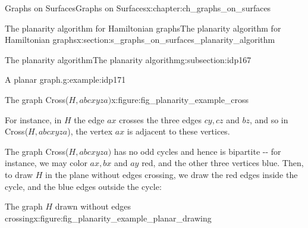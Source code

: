 \documentclass[oneside,10pt,]{book}
\numberwithin{equation}{section}
\begin{document}
\begin{chapterptx}{Graphs on Surfaces}{}{Graphs on Surfaces}{}{}{x:chapter:ch_graphs_on_surfaces}
\begin{sectionptx}{The planarity algorithm for Hamiltonian graphs}{}{The planarity algorithm for Hamiltonian graphs}{}{}{x:section:s_graphs_on_surfaces_planarity_algorithm}
\begin{subsectionptx}{The planarity algorithm}{}{The planarity algorithm}{}{}{g:subsection:idp167}
\begin{example}{A planar graph.}{g:example:idp171}
\begin{figureptx}{The graph Cross(\(H, abcxyza)\)}{x:figure:fig_planarity_example_cross}{}
\begin{image}{0.15}{0.7}{0.15}
{
}%
\end{image}%
\tcblower
\end{figureptx}%
For instance, in \(H\) the edge \(ax\) crosses the three edges \(cy, cz\) and \(bz\), and so in Cross(\(H, abcxyza\)), the vertex \(ax\) is adjacent to these vertices.%
\par
The graph Cross(\(H, abcxyza)\) has no odd cycles and hence is bipartite -{}-{} for instance, we may color \(ax, bx\) and \(ay\) red, and the other three vertices blue.  Then, to draw \(H\) in the plane without edges crossing, we draw the red edges inside the cycle, and the blue edges outside the cycle:%
\begin{figureptx}{The graph \(H\) drawn without edges crossing}{x:figure:fig_planarity_example_planar_drawing}{}%
\begin{image}{0.15}{0.7}{0.15}%
\end{image}
\end{figureptx}
\end{example}
\end{subsectionptx}
\end{sectionptx}
\end{chapterptx}
\end{document}
